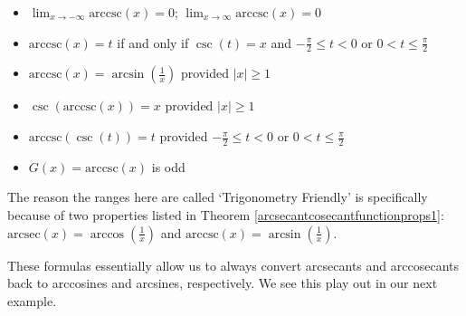 \documentclass{ximera}
\begin{document}
\begin{theorem}
\begin{itemize}
\begin{itemize}
\item   $\lim_{x \rightarrow -\infty} \text{arccsc}(x) =0$; $\lim_{x \rightarrow \infty} \text{arccsc}(x) =0$ 

\item  $\text{arccsc}(x) = t$ if and only if $\csc(t) = x$ and $-\frac{\pi}{2} \leq t < 0$ or $0 < t \leq \frac{\pi}{2}$

\item  $\text{arccsc}(x) = \arcsin\left(\frac{1}{x}\right)$ provided $|x| \geq 1$

\item  $\csc\left(\text{arccsc}(x)\right) = x$ provided $|x| \geq 1$

\item  $\text{arccsc}(\csc(t)) = t$ provided $-\frac{\pi}{2} \leq t < 0$ or $0 < t \leq \frac{\pi}{2}$

\item  $G(x) = \text{arccsc}(x)$ is odd

\end{itemize}

\end{itemize}

\end{theorem}

 


 

The reason the ranges here are called `Trigonometry Friendly' is specifically because of two properties listed in Theorem \ref{arcsecantcosecantfunctionprops1}:   $\text{arcsec}(x) = \arccos\left(\frac{1}{x}\right)$ and $\text{arccsc}(x) = \arcsin\left(\frac{1}{x}\right)$.  

 

These formulas essentially  allow us to always convert arcsecants and arccosecants back to arccosines and arcsines, respectively.  We see this play out in our next example.
\end{document}
